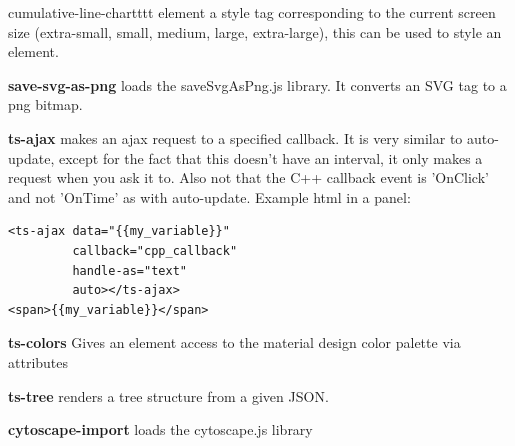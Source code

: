 \begin{labeling}{cumulative-line-chartttt}
element a style tag corresponding to the current screen size (extra-small, small,
medium, large, extra-large), this can be used to style an element.
\item [\textbf{save-svg-as-png}] loads the saveSvgAsPng.js library. It converts an SVG tag to a png bitmap.
\item [\textbf{ts-ajax}] makes an ajax request to a specified callback.
It is very similar to auto-update, except for the fact that this doesn't have an interval, it only makes a request when you ask it to. Also not that the C++ callback event is 'OnClick' and not 'OnTime' as with auto-update.
Example html in a panel:
\begin{verbatim}
<ts-ajax data="{{my_variable}}"
         callback="cpp_callback"
         handle-as="text"
         auto></ts-ajax>
<span>{{my_variable}}</span>
\end{verbatim}
\item [\textbf{ts-colors}] Gives an element access to the material design color palette via attributes
\item [\textbf{ts-tree}] renders a tree structure from a given JSON.
\item [\textbf{cytoscape-import}] loads the cytoscape.js library



\end{labeling}
